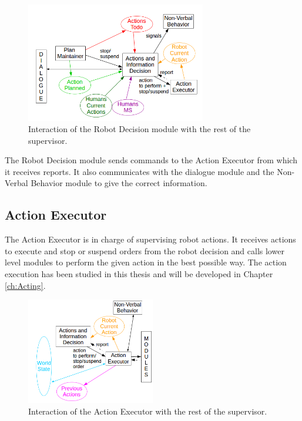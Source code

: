 \documentclass[english,a4paper,11pt,twoside]{StyleThese}
\begin{document}
\begin{figure}[h]
	\centering
    \includegraphics[width=0.7\textwidth]{figs/Chapter2/RobotDecision.png}
    \caption{Interaction of the Robot Decision module with the rest of the supervisor.}
    \label{fig:robotDecition}
\end{figure}

The Robot Decision module sends commands to the Action Executor from which it receives reports. It also communicates with the dialogue module and the Non-Verbal Behavior module to give the correct information.

\subsection{Action Executor}

The Action Executor is in charge of supervising robot actions. It receives actions to execute and stop or suspend orders from the robot decision and calls lower level modules to perform the given action in the best possible way. The action execution has been studied in this thesis and will be developed in Chapter \ref{ch:Acting}.

\begin{figure}[!h]
	\centering
    \includegraphics[width=0.5\textwidth]{figs/Chapter2/ActionExecutor.png}
    \caption{Interaction of the Action Executor with the rest of the supervisor.}
    \label{fig:actionExecutor}
\end{figure}
\end{document}
